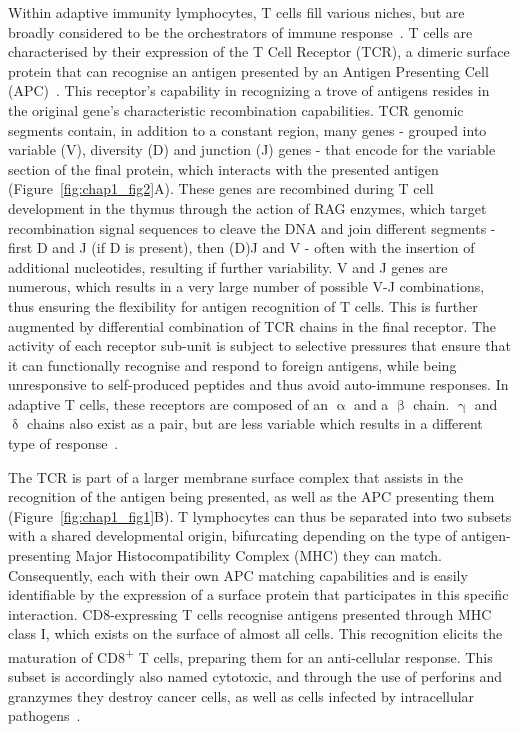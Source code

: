 Within adaptive immunity lymphocytes, T cells fill various niches, but are broadly considered to be the orchestrators of immune response~\citep{kumar_human_2018}. T cells are characterised by their expression of the T Cell Receptor (TCR), a dimeric surface protein that can recognise an antigen presented by an Antigen Presenting Cell (APC)~\citep{reinherz_revisiting_2014}. This receptor's capability in recognizing a trove of antigens resides in the original gene's characteristic recombination capabilities. TCR genomic segments contain, in addition to a constant region, many genes - grouped into variable (V), diversity (D) and junction (J) genes - that encode for the variable section of the final protein, which interacts with the presented antigen (Figure~\ref{fig:chap1_fig2}A). These genes are recombined during T cell development in the thymus through the action of RAG enzymes, which target recombination signal sequences to cleave the DNA and join different segments - first D and J (if D is present), then (D)J and V - often with the insertion of additional nucleotides, resulting if further variability. V and J genes are numerous, which results in a very large number of possible V-J combinations, thus ensuring the flexibility for antigen recognition of T cells. This is further augmented by differential combination of TCR chains in the final receptor. The activity of each receptor sub-unit is subject to selective pressures that ensure that it can functionally recognise and respond to foreign antigens, while being unresponsive to self-produced peptides and thus avoid auto-immune responses. In adaptive T cells, these receptors are composed of an ${\upalpha}$ and a ${\upbeta}$ chain. ${\upgamma}$ and ${\updelta}$ chains also exist as a pair, but are less variable which results in a different type of response~\citep{simoes_molecular_2018}.

The TCR is part of a larger membrane surface complex that assists in the recognition of the antigen being presented, as well as the APC presenting them (Figure~\ref{fig:chap1_fig1}B). T lymphocytes can thus be separated into two subsets with a shared developmental origin, bifurcating depending on the type of antigen-presenting Major Histocompatibility Complex (MHC) they can match. Consequently, each with their own APC matching capabilities and is easily identifiable by the expression of a surface protein that participates in this specific interaction. CD8-expressing T cells recognise antigens presented through MHC class I, which exists on the surface of almost all cells. This recognition elicits the maturation of CD8\textsuperscript{+} T cells, preparing them for an anti-cellular response. This subset is accordingly also named cytotoxic, and through the use of perforins and granzymes they destroy cancer cells, as well as cells infected by intracellular pathogens~\citep{halle_mechanisms_2017}.

